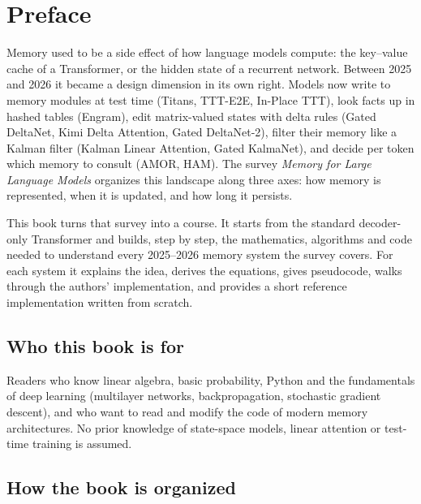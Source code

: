 \chapter{Preface}

Memory used to be a side effect of how language models compute: the key--value cache of a
Transformer, or the hidden state of a recurrent network. Between 2025 and 2026 it became a
design dimension in its own right. Models now write to memory modules at test time (Titans,
TTT-E2E, In-Place TTT), look facts up in hashed tables (Engram), edit matrix-valued states
with delta rules (Gated DeltaNet, Kimi Delta Attention, Gated DeltaNet-2), filter their memory
like a Kalman filter (Kalman Linear Attention, Gated KalmaNet), and decide per token which
memory to consult (AMOR, HAM). The survey \emph{Memory for Large Language Models}
\citep{zhoubian2026memory} organizes this landscape along three axes: how memory is
represented, when it is updated, and how long it persists.

This book turns that survey into a course. It starts from the standard decoder-only
Transformer and builds, step by step, the mathematics, algorithms and code needed to
understand every 2025--2026 memory system the survey covers. For each system it explains the
idea, derives the equations, gives pseudocode, walks through the authors' implementation, and
provides a short reference implementation written from scratch.

\section*{Who this book is for}

Readers who know linear algebra, basic probability, Python and the fundamentals of deep
learning (multilayer networks, backpropagation, stochastic gradient descent), and who want to
read and modify the code of modern memory architectures. No prior knowledge of state-space
models, linear attention or test-time training is assumed.

\section*{How the book is organized}


